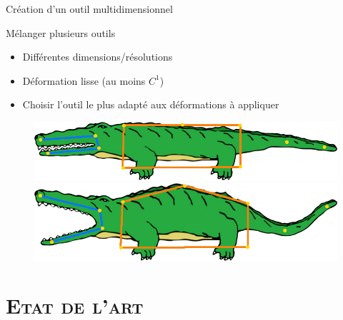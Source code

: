 \documentclass[xcolor=x11names,compress]{beamer}
\renewcommand{\(}{\begin{columns}} \renewcommand{\)}{\end{columns}}
\newcommand{\<}[1]{\begin{column}{#1}} \renewcommand{\>}{\end{column}}
\begin{document}
\begin{frame}{Création d'un outil multidimensionnel}
  \begin{block}{Mélanger plusieurs outils}
    \begin{itemize}
    \item Différentes dimensions/résolutions
    \item Déformation lisse (au moins $C^1$)
    \item Choisir l'outil le plus adapté aux déformations à appliquer
    \end{itemize}
  \end{block}
  \begin{figure}[h]
    \begin{center}
      \includegraphics[scale=0.15]{alligator-avant}
      \includegraphics[scale=0.15]{alligator-apres}
    \end{center}
    \caption{\citep{JBPS11}}
  \end{figure}
\end{frame}


\section{\scshape Etat de l'art}
\end{document}
